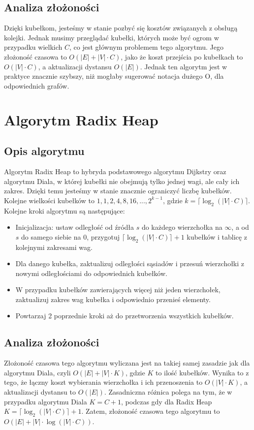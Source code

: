 \documentclass{article}
\begin{document}
\subsection{Analiza złożoności}
Dzięki kubełkom, jesteśmy w stanie pozbyć się kosztów związanych z obsługą kolejki.
Jednak musimy przeglądać kubełki, których może być ogrom w przypadku wielkich $C$, co jest głównym problemem tego algorytmu.
Jego złożoność czasowa to $O(|E| + |V| \cdot C)$, jako że koszt przejścia po kubełkach to $O(|V| \cdot C)$, a aktualizacji dystansu $O(|E|)$.
Jednak ten algorytm jest w praktyce znacznie szybszy, niż mogłaby sugerować notacja dużego O, dla odpowiednich grafów.

\section{Algorytm Radix Heap}

\subsection{Opis algorytmu}
Algorytm Radix Heap to hybryda podstawowego algorytmu Dijkstry oraz algorytmu Diala, w której kubełki nie obejmują tylko jednej wagi, ale cały ich zakres.
Dzięki temu jesteśmy w stanie znacznie ograniczyć liczbę kubełków. Kolejne wielkości kubełków to $1, 1, 2, 4, 8, 16, ..., 2^{k - 1}$, gdzie $k = \lceil \log_2 (|V| \cdot C) \rceil$. \\

\noindent Kolejne kroki algorytmu są następujące:

\begin{itemize}
    \item Inicjalizacja: ustaw odległość od źródła \( s \) do każdego wierzchołka na \( \infty \), a od \( s \) do samego siebie na 0, przygotuj $\lceil \log_2 (|V| \cdot C) \rceil + 1$ kubełków i tablicę z kolejnymi zakresami wag.
    \item Dla danego kubełka, zaktualizuj odległości sąsiadów i przesuń wierzchołki z nowymi odległościami do odpowiednich kubełków.
    \item W przypadku kubełków zawierających więcej niż jeden wierzchołek, zaktualizuj zakres wag kubełka i odpowiednio przenieś elementy.
    \item Powtarzaj 2 poprzednie kroki aż do przetworzenia wszystkich kubełków.
\end{itemize}

\subsection{Analiza złożoności}
Złożoność czasowa tego algorytmu wyliczana jest na takiej samej zasadzie jak dla algorytmu Diala, czyli $O(|E| + |V| \cdot K)$, gdzie $K$ to ilość kubełków.
Wynika to z tego, że łączny koszt wybierania wierzchołka i ich przenoszenia to $O(|V| \cdot K)$, a aktualizacji dystansu to $O(|E|)$.
Zasadniczna różnica polega na tym, że w przypadku algorytmu Diala $K = C + 1$, podczas gdy dla Radix Heap $K = \lceil \log_2 (|V| \cdot C) \rceil + 1$.
Zatem, złożoność czasowa tego algorytmu to $O(|E| + |V| \cdot \log (|V| \cdot C))$.
\end{document}

